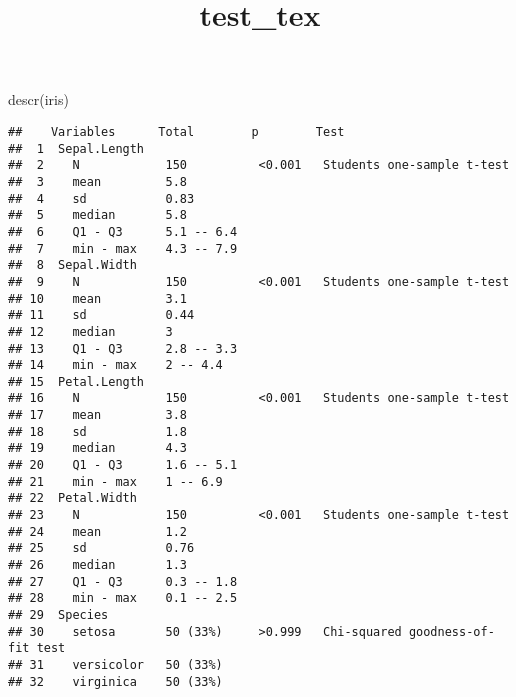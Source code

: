 \documentclass[
]{article}
\title{test\_tex}
\author{}
\date{\vspace{-2.5em}}
\newenvironment{Shaded}{\begin{snugshade}}{\end{snugshade}}
\newcommand{\FunctionTok}[1]{\textcolor[rgb]{0.00,0.00,0.00}{#1}}
\newcommand{\NormalTok}[1]{#1}
\begin{document}
\maketitle

{
\setcounter{tocdepth}{2}
\tableofcontents
}
\begin{Shaded}
\begin{Highlighting}[]
\FunctionTok{descr}\NormalTok{(iris)}
\end{Highlighting}
\end{Shaded}

\begin{verbatim}
##    Variables      Total        p        Test                              
##  1  Sepal.Length                                                          
##  2    N            150          <0.001   Students one-sample t-test       
##  3    mean         5.8                                                    
##  4    sd           0.83                                                   
##  5    median       5.8                                                    
##  6    Q1 - Q3      5.1 -- 6.4                                             
##  7    min - max    4.3 -- 7.9                                             
##  8  Sepal.Width                                                           
##  9    N            150          <0.001   Students one-sample t-test       
## 10    mean         3.1                                                    
## 11    sd           0.44                                                   
## 12    median       3                                                      
## 13    Q1 - Q3      2.8 -- 3.3                                             
## 14    min - max    2 -- 4.4                                               
## 15  Petal.Length                                                          
## 16    N            150          <0.001   Students one-sample t-test       
## 17    mean         3.8                                                    
## 18    sd           1.8                                                    
## 19    median       4.3                                                    
## 20    Q1 - Q3      1.6 -- 5.1                                             
## 21    min - max    1 -- 6.9                                               
## 22  Petal.Width                                                           
## 23    N            150          <0.001   Students one-sample t-test       
## 24    mean         1.2                                                    
## 25    sd           0.76                                                   
## 26    median       1.3                                                    
## 27    Q1 - Q3      0.3 -- 1.8                                             
## 28    min - max    0.1 -- 2.5                                             
## 29  Species                                                               
## 30    setosa       50 (33%)     >0.999   Chi-squared goodness-of-fit test 
## 31    versicolor   50 (33%)                                               
## 32    virginica    50 (33%)
\end{verbatim}
\end{document}
